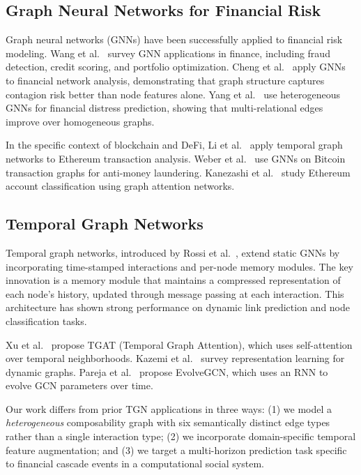 \documentclass[journal]{IEEEtran}
\begin{document}
\subsection{Graph Neural Networks for Financial Risk}

Graph neural networks (GNNs) have been successfully applied to financial risk modeling.
Wang et al.~\cite{wang2021review} survey GNN applications in finance, including fraud detection, credit scoring, and portfolio optimization.
Cheng et al.~\cite{cheng2022financial} apply GNNs to financial network analysis, demonstrating that graph structure captures contagion risk better than node features alone.
Yang et al.~\cite{yang2020financial} use heterogeneous GNNs for financial distress prediction, showing that multi-relational edges improve over homogeneous graphs.

In the specific context of blockchain and DeFi, Li et al.~\cite{li2022tgn} apply temporal graph networks to Ethereum transaction analysis.
Weber et al.~\cite{weber2019anti} use GNNs on Bitcoin transaction graphs for anti-money laundering.
Kanezashi et al.~\cite{kanezashi2022ethereum} study Ethereum account classification using graph attention networks.

\subsection{Temporal Graph Networks}

Temporal graph networks, introduced by Rossi et al.~\cite{rossi2020tgn}, extend static GNNs by incorporating time-stamped interactions and per-node memory modules.
The key innovation is a memory module that maintains a compressed representation of each node's history, updated through message passing at each interaction.
This architecture has shown strong performance on dynamic link prediction and node classification tasks.

Xu et al.~\cite{xu2020inductive} propose TGAT (Temporal Graph Attention), which uses self-attention over temporal neighborhoods.
Kazemi et al.~\cite{kazemi2020representation} survey representation learning for dynamic graphs.
Pareja et al.~\cite{pareja2020evolvegcn} propose EvolveGCN, which uses an RNN to evolve GCN parameters over time.

Our work differs from prior TGN applications in three ways: (1) we model a \emph{heterogeneous} composability graph with six semantically distinct edge types rather than a single interaction type; (2) we incorporate domain-specific temporal feature augmentation; and (3) we target a multi-horizon prediction task specific to financial cascade events in a computational social system.
\end{document}
